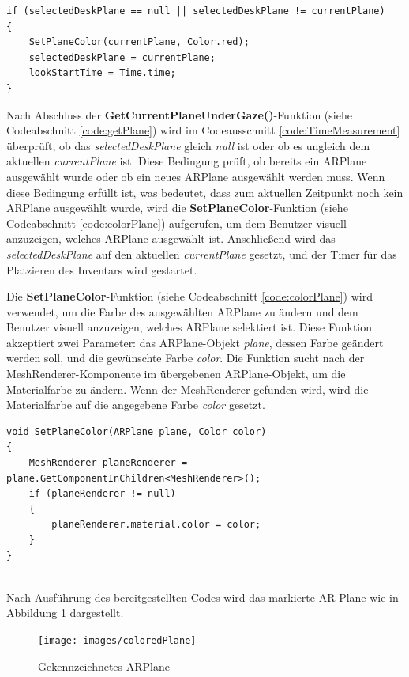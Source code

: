 \begin{lstlisting}[style=csharp, caption={Plane auswaehlen und timer starten}, label=code:TimeMeasurement]
if (selectedDeskPlane == null || selectedDeskPlane != currentPlane)
{
    SetPlaneColor(currentPlane, Color.red);
    selectedDeskPlane = currentPlane;
    lookStartTime = Time.time;
}
\end{lstlisting}
Nach Abschluss der \textbf{GetCurrentPlaneUnderGaze()}-Funktion (siehe Codeabschnitt \ref{code:getPlane}) wird im
Codeausschnitt \ref{code:TimeMeasurement} überprüft, ob das \textit{selectedDeskPlane} gleich \textit{null} ist oder ob
es ungleich dem aktuellen \textit{currentPlane} ist. Diese Bedingung prüft, ob bereits ein ARPlane ausgewählt wurde oder
ob ein neues ARPlane ausgewählt werden muss. Wenn diese Bedingung erfüllt ist, was bedeutet, dass zum aktuellen Zeitpunkt
noch kein ARPlane ausgewählt wurde, wird die \textbf{SetPlaneColor}-Funktion (siehe Codeabschnitt \ref{code:colorPlane})
aufgerufen, um dem Benutzer visuell anzuzeigen, welches ARPlane ausgewählt ist. Anschließend wird das \textit{selectedDeskPlane}
auf den aktuellen \textit{currentPlane} gesetzt, und der Timer für das Platzieren des Inventars wird gestartet.

Die \textbf{SetPlaneColor}-Funktion (siehe Codeabschnitt \ref{code:colorPlane}) wird verwendet, um die Farbe des ausgewählten
ARPlane zu ändern und dem Benutzer visuell anzuzeigen, welches ARPlane selektiert ist. Diese Funktion akzeptiert zwei
Parameter: das ARPlane-Objekt \textit{plane}, dessen Farbe geändert werden soll, und die gewünschte Farbe \textit{color}.
Die Funktion sucht nach der MeshRenderer-Komponente im übergebenen ARPlane-Objekt, um die Materialfarbe zu ändern. Wenn
der MeshRenderer gefunden wird, wird die Materialfarbe auf die angegebene Farbe \textit{color} gesetzt.
\begin{lstlisting}[style=csharp, caption={Ausgewaehltes ARPlane kennzeichnen}, label=code:colorPlane]
void SetPlaneColor(ARPlane plane, Color color)
{
    MeshRenderer planeRenderer = plane.GetComponentInChildren<MeshRenderer>();
    if (planeRenderer != null)
    {
        planeRenderer.material.color = color;
    }
}
\end{lstlisting}\\

Nach Ausführung des bereitgestellten Codes wird das markierte AR-Plane wie in Abbildung \ref{fig:colPlane} dargestellt.
\begin{figure}[h]
    \centering
    \texttt{[image: images/coloredPlane]}
    \caption{Gekennzeichnetes ARPlane}
    \label{fig:colPlane}
\end{figure}

